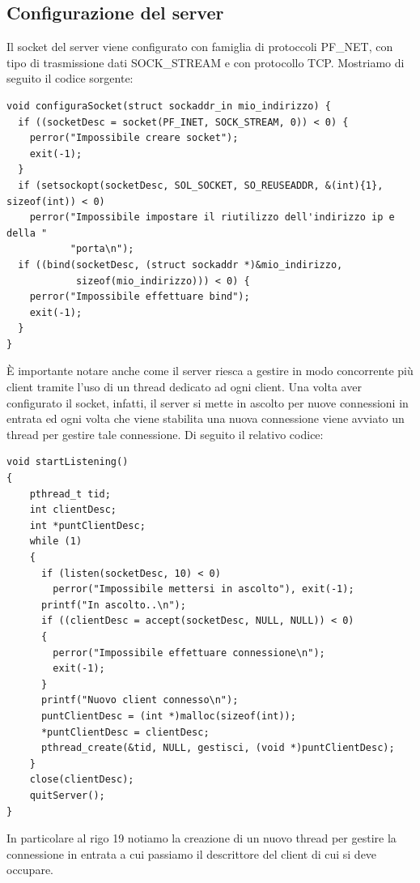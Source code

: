 \documentclass[a4paper]{article}
\begin{document}
\subsection{Configurazione del server}
Il socket del server viene configurato con famiglia di protoccoli PF\_NET, con tipo di trasmissione dati SOCK\_STREAM e con protocollo TCP. Mostriamo di seguito il codice sorgente:
\begin{lstlisting}
void configuraSocket(struct sockaddr_in mio_indirizzo) {
  if ((socketDesc = socket(PF_INET, SOCK_STREAM, 0)) < 0) {
    perror("Impossibile creare socket");
    exit(-1);
  }
  if (setsockopt(socketDesc, SOL_SOCKET, SO_REUSEADDR, &(int){1}, sizeof(int)) < 0)
    perror("Impossibile impostare il riutilizzo dell'indirizzo ip e della "
           "porta\n");
  if ((bind(socketDesc, (struct sockaddr *)&mio_indirizzo,
            sizeof(mio_indirizzo))) < 0) {
    perror("Impossibile effettuare bind");
    exit(-1);
  }
}
\end{lstlisting}
È importante notare anche come il server riesca a gestire in modo concorrente più client tramite l'uso di un thread dedicato ad ogni client. 
Una volta aver configurato il socket, infatti,  il server si mette in ascolto per nuove connessioni in entrata ed ogni volta che
viene stabilita una nuova connessione viene avviato un thread per gestire tale connessione. Di seguito il relativo codice: 
\begin{lstlisting}
void startListening()
{
    pthread_t tid;
    int clientDesc;
    int *puntClientDesc;
    while (1)
    {
      if (listen(socketDesc, 10) < 0)
        perror("Impossibile mettersi in ascolto"), exit(-1);
      printf("In ascolto..\n");
      if ((clientDesc = accept(socketDesc, NULL, NULL)) < 0)
      {
        perror("Impossibile effettuare connessione\n");
        exit(-1);
      }
      printf("Nuovo client connesso\n");
      puntClientDesc = (int *)malloc(sizeof(int));
      *puntClientDesc = clientDesc;
      pthread_create(&tid, NULL, gestisci, (void *)puntClientDesc);
    }
    close(clientDesc);
    quitServer();
}
\end{lstlisting}
In particolare al rigo 19 notiamo la creazione di un nuovo thread per gestire la connessione in entrata a cui passiamo il descrittore del client di cui si deve occupare.
\pagebreak
\end{document}
